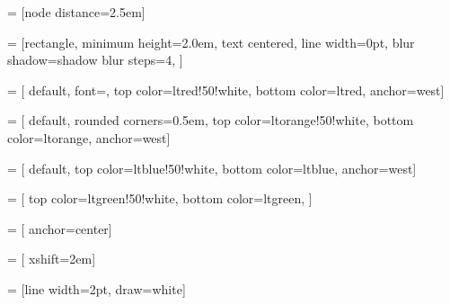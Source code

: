 \usetikzlibrary{positioning,arrows,shapes,calc,shadows.blur}

 = [node distance=2.5em]

 = [rectangle,
  minimum height=2.0em,
  text centered,
  line width=0pt,
  blur shadow={shadow blur steps=4},
]

 = [
default,
font={\bfseries},
  top color=ltred!50!white,
  bottom color=ltred,
  anchor=west]

 = [
  default,
  rounded corners=0.5em,
  top color=ltorange!50!white,
  bottom color=ltorange,
  anchor=west]

 = [
  default,
  top color=ltblue!50!white,
  bottom color=ltblue,
  anchor=west]
  
 = [
  top color=ltgreen!50!white,
  bottom color=ltgreen,
  ]

 = [
  anchor=center]

 = [
  xshift=2em]

\newcommand{\variable}[1]{{\itshape #1}}
\newcommand{\duscore}{\_\_}

 = [line width=2pt, draw=white]

